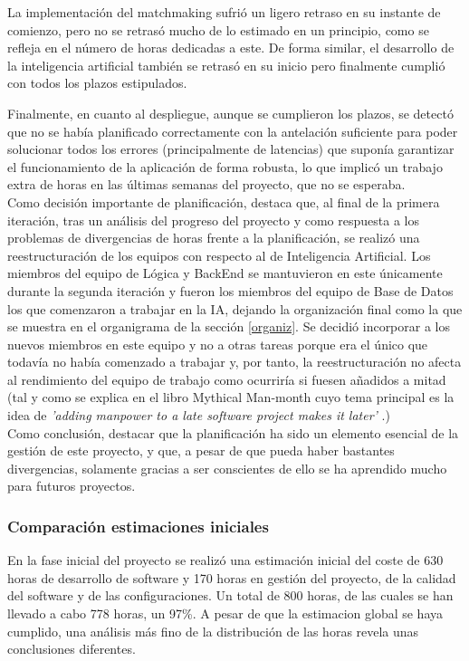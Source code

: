 La implementación del matchmaking sufrió un ligero retraso en su instante de comienzo, pero no se retrasó mucho de lo estimado en un principio, como se refleja en el número de horas dedicadas a este. De forma similar, el desarrollo de la inteligencia artificial también se retrasó en su inicio pero finalmente cumplió con todos los plazos estipulados.

Finalmente, en cuanto al despliegue, aunque se cumplieron los plazos, se detectó que no se había planificado correctamente con la antelación suficiente para poder solucionar todos los errores (principalmente de latencias) que suponía garantizar el funcionamiento de la aplicación de forma robusta, lo que implicó un trabajo extra de horas en las últimas semanas del proyecto, que no se esperaba.\\

Como decisión importante de planificación, destaca que, al final de la primera iteración, tras un análisis del progreso del proyecto y como respuesta a los problemas de divergencias de horas frente a la planificación, se realizó una reestructuración de los equipos con respecto al de Inteligencia Artificial. Los miembros del equipo de Lógica y BackEnd se mantuvieron en este únicamente durante la segunda iteración y fueron los miembros del equipo de Base de Datos los que comenzaron a trabajar en la IA, dejando la organización final como la que se muestra en el organigrama de la sección \ref{organiz}. Se decidió incorporar a los nuevos miembros en este equipo y no a otras tareas porque era el único que todavía no había comenzado a trabajar y, por tanto, la reestructuración no afecta al rendimiento del equipo de trabajo como ocurriría si fuesen añadidos a mitad (tal y como se explica en el libro Mythical Man-month cuyo tema principal es la idea de \textit{'adding manpower to a late software project makes it later'} \cite{libroMMM}.)\\

Como conclusión, destacar que la planificación ha sido un elemento esencial de la gestión de este proyecto, y que, a pesar de que pueda haber bastantes divergencias, solamente gracias a ser conscientes de ello se ha aprendido mucho para futuros proyectos.

\subsubsection{Comparación estimaciones iniciales}
En la fase inicial del proyecto se realizó una estimación inicial del coste de 630 horas de desarrollo de software y 170 horas en gestión del proyecto, de la calidad del software y de las configuraciones. Un total de 800 horas, de las cuales se han llevado a cabo 778 horas, un 97\%. A pesar de que la estimacion global se haya cumplido, una análisis más fino de la distribución de las horas revela unas conclusiones diferentes.

